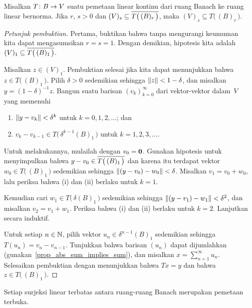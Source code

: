\begin{prop}\label{prop_for_OMT} Misalkan $T\colon B \rightarrow V$ suatu pemetaan linear kontinu dari ruang Banach ke ruang linear bernorma.
Jika $r$, $s > 0$ dan $(V)_s \subseteq \overline{T\bigl(\,(B)_r\,\bigr)}$, maka $(V)_s \subseteq T\bigl(\,(B)_r\,\bigr)$.
\end{prop}

\begin{proof}[\emph{Petunjuk pembuktian}] Pertama, buktikan bahwa tanpa mengurangi keumuman kita dapat mengasumsikan $r = s = 1$.  Dengan demikian,
hipotesis kita adalah $(V)_1 \subseteq \overline{T\bigl(\,(B)_1\,\bigr)}$.

Misalkan $z \in (V)_1$.  Pembuktian selesai jika kita dapat menunjukkan bahwa $z \in T\bigl(\,(B)_1\,\bigr)$.  Pilih $\delta > 0$ sedemikian
sehingga $\lVert z\rVert < 1 - \delta$, dan misalkan $y = (1 - \delta)^{-1}z$.  Bangun suatu barisan $(v_k)_{k=0}^\infty$ dari vektor-vektor dalam~$V$
yang memenuhi
   \begin{enumerate}
     \item[(i)] $\lVert y - v_k\rVert < \delta^k$ untuk $k = 0,1,2,\dots$; dan
     \item[(ii)] $v_k - v_{k-1} \in T\bigl(\,\delta^{k-1}(B)_1\,\bigr)$ untuk $k = 1,2,3,\dots$.
   \end{enumerate}
Untuk melakukannya, mulailah dengan $v_0 = \mathbf{0}$. Gunakan hipotesis untuk menyimpulkan bahwa $y - v_0 \in \overline{T\bigl(\,(B)_1\,\bigr)}$ dan
karena itu terdapat vektor $w_0 \in T\bigl(\,(B)_1\,\bigr)$ sedemikian sehingga $\lVert(y - v_0) - w_0\rVert < \delta$.  Misalkan
$v_1 = v_0 + w_0$, lalu periksa bahwa (i) dan (ii) berlaku untuk $k = 1$.

Kemudian cari $w_1 \in T\bigl(\,\delta (B)_1\,\bigr)$ sedemikian sehingga $\lVert(y - v_1) - w_1\rVert < \delta^2$, dan misalkan $v_2 = v_1 + w_1$.
Periksa bahwa (i) dan (ii) berlaku untuk $k= 2$.  Lanjutkan secara induktif.

Untuk setiap $n \in \mathbb{N}$, pilih vektor $u_n \in \delta^{n-1}(B)_1$ sedemikian sehingga $T(u_n) = v_n - v_{n-1}$. Tunjukkan bahwa barisan
$(u_n)$ dapat dijumlahkan (gunakan~\ref{prop_abs_sum_implies_sum}), dan misalkan $x = \sum_{n=1}^\infty u_n$.  Selesaikan pembuktian dengan menunjukkan
bahwa $Tx = y$ dan bahwa $z \in T\bigl(\,(B)_1\,\bigr)$.   \ns
\end{proof}

\begin{thm}\label{C069414} Setiap surjeksi linear terbatas antara
ruang-ruang Banach merupakan pemetaan terbuka.
\end{thm}

